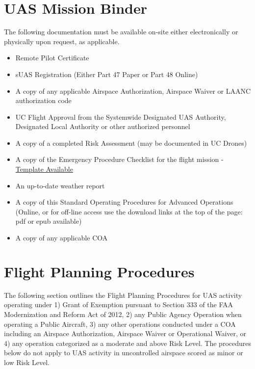 \documentclass[
]{book}
\providecommand{\tightlist}{%
  \setlength{\itemsep}{0pt}\setlength{\parskip}{0pt}}
\begin{document}
\chapter{UAS Mission Binder}\label{ch-mission-binder}

The following documentation must be available on-site either electronically or physically upon request, as applicable.

\begin{itemize}
\tightlist
\item
  Remote Pilot Certificate
\item
  sUAS Registration (Either Part 47 Paper or Part 48 Online)
\item
  A copy of any applicable Airspace Authorization, Airspace Waiver or LAANC authorization code
\item
  UC Flight Approval from the Systemwide Designated UAS Authority, Designated Local Authority or other authorized personnel
\item
  A copy of a completed Risk Assessment (may be documented in UC Drones)
\item
  A copy of the Emergency Procedure Checklist for the flight mission - \href{https://ucdrones.github.io/ch-resources.html}{Template Available}
\item
  An up-to-date weather report
\item
  A copy of this Standard Operating Procedures for Advanced Operations (Online, or for off-line access use the download links at the top of the page: pdf or epub available)
\item
  A copy of any applicable COA
\end{itemize}

\chapter{Flight Planning Procedures}\label{ch-flight-planning}

The following section outlines the Flight Planning Procedures for UAS activity operating under 1) Grant of Exemption pursuant to Section 333 of the FAA Modernization and Reform Act of 2012, 2) any Public Agency Operation when operating a Public Aircraft, 3) any other operations conducted under a COA including an Airspace Authorization, Airspace Waiver or Operational Waiver, or 4) any operation categorized as a moderate and above Risk Level. The procedures below do not apply to UAS activity in uncontrolled airspace scored as minor or low Risk Level.
\end{document}
